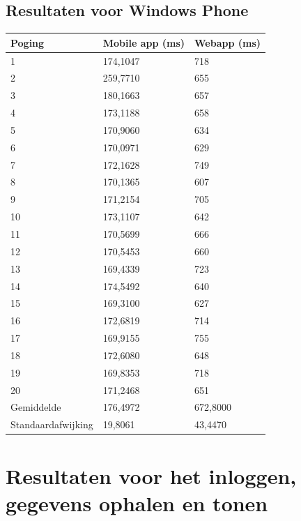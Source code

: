\documentclass[pdftex,a4paper,12pt,twoside]{report}
\begin{document}
\subsection{Resultaten voor Windows Phone}
\begin{center}
    \begin{tabular}{ | l | l | l |}
    \hline
    Poging & Mobile app (ms) & Webapp (ms)
      \\ \hline
      1 & 174,1047 & 718
      \\ \hline
      2 & 259,7710 & 655
      \\ \hline
      3 & 180,1663 & 657
      \\ \hline
      4 & 173,1188 & 658
      \\ \hline
      5 & 170,9060 & 634
      \\ \hline
      6 & 170,0971 & 629
      \\ \hline
      7 & 172,1628 & 749
      \\ \hline
      8 & 170,1365 & 607
      \\ \hline
      9 & 171,2154 & 705
      \\ \hline
      10 & 173,1107 & 642
      \\ \hline
      11 & 170,5699 & 666
      \\ \hline
      12 & 170,5453 & 660
      \\ \hline
      13 & 169,4339 & 723
      \\ \hline
      14 & 174,5492 & 640
      \\ \hline
      15 & 169,3100 & 627
      \\ \hline
      16 & 172,6819 & 714
      \\ \hline
      17 & 169,9155 & 755
      \\ \hline
      18 & 172,6080 & 648
      \\ \hline
      19 & 169,8353 & 718
      \\ \hline
      20 & 171,2468 & 651
      \\ \hline
      Gemiddelde & 176,4972 & 672,8000
      \\ \hline
      Standaardafwijking & 19,8061 & 43,4470
      \\ \hline
    \end{tabular}
\end{center}
\newpage
\section{Resultaten voor het inloggen, gegevens ophalen en tonen}
\end{document}
